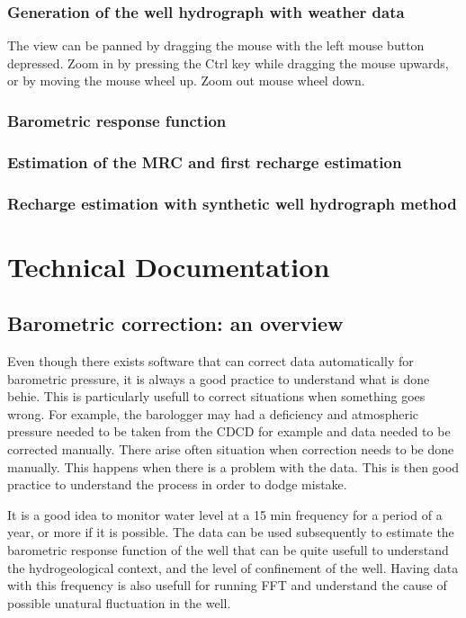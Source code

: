 \documentclass[12pt, letterpaper, fleqn]{report}
\begin{document}
\subsection{Generation of the well hydrograph with weather data}

The view can be panned by dragging the mouse with the left mouse button depressed. Zoom in by pressing the Ctrl key while dragging the mouse upwards, or by moving the mouse wheel up. Zoom out mouse wheel down.

\subsection{Barometric response function}
\subsection{Estimation of the MRC and first recharge estimation}
\subsection{Recharge estimation with synthetic well hydrograph method}

\chapter{Technical Documentation}

\section{Barometric correction: an overview}

\cite{freeman_use_2004}

Even though there exists software that can correct data automatically for barometric pressure, it is always a good practice to understand what is done behie. This is particularly usefull to correct situations when something goes wrong. For example, the barologger may had a deficiency and atmospheric pressure needed to be taken from the CDCD for example and data needed to be corrected manually. There arise often situation when correction needs to be done manually. This happens when there is a problem with the data. This is then good practice to understand the process in order to dodge mistake.

It is a good idea to monitor water level at a 15 min frequency for a period of a year, or more if it is possible. The data can be used subsequently to estimate the barometric response function of the well that can be quite usefull to understand the hydrogeological context, and the level of confinement of the well. Having data with this frequency is also usefull for running FFT and understand the cause of possible unatural fluctuation in the well.
\end{document}
